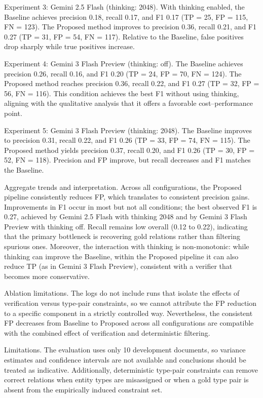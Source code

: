 \documentclass{article} %
\begin{document}
Experiment 3: Gemini 2.5 Flash (thinking: 2048). With thinking enabled, the Baseline achieves precision 0.18, recall 0.17, and F1 0.17 (TP = 25, FP = 115, FN = 123). The Proposed method improves to precision 0.36, recall 0.21, and F1 0.27 (TP = 31, FP = 54, FN = 117). Relative to the Baseline, false positives drop sharply while true positives increase.

Experiment 4: Gemini 3 Flash Preview (thinking: off). The Baseline achieves precision 0.26, recall 0.16, and F1 0.20 (TP = 24, FP = 70, FN = 124). The Proposed method reaches precision 0.36, recall 0.22, and F1 0.27 (TP = 32, FP = 56, FN = 116). This condition achieves the best F1 without using thinking, aligning with the qualitative analysis that it offers a favorable cost–performance point.

Experiment 5: Gemini 3 Flash Preview (thinking: 2048). The Baseline improves to precision 0.31, recall 0.22, and F1 0.26 (TP = 33, FP = 74, FN = 115). The Proposed method yields precision 0.37, recall 0.20, and F1 0.26 (TP = 30, FP = 52, FN = 118). Precision and FP improve, but recall decreases and F1 matches the Baseline.

Aggregate trends and interpretation. Across all configurations, the Proposed pipeline consistently reduces FP, which translates to consistent precision gains. Improvements in F1 occur in most but not all conditions; the best observed F1 is 0.27, achieved by Gemini 2.5 Flash with thinking 2048 and by Gemini 3 Flash Preview with thinking off. Recall remains low overall (0.12 to 0.22), indicating that the primary bottleneck is recovering gold relations rather than filtering spurious ones. Moreover, the interaction with thinking is non-monotonic: while thinking can improve the Baseline, within the Proposed pipeline it can also reduce TP (as in Gemini 3 Flash Preview), consistent with a verifier that becomes more conservative.

Ablation limitations. The logs do not include runs that isolate the effects of verification versus type-pair constraints, so we cannot attribute the FP reduction to a specific component in a strictly controlled way. Nevertheless, the consistent FP decreases from Baseline to Proposed across all configurations are compatible with the combined effect of verification and deterministic filtering.

Limitations. The evaluation uses only 10 development documents, so variance estimates and confidence intervals are not available and conclusions should be treated as indicative. Additionally, deterministic type-pair constraints can remove correct relations when entity types are misassigned or when a gold type pair is absent from the empirically induced constraint set.
\end{document}

